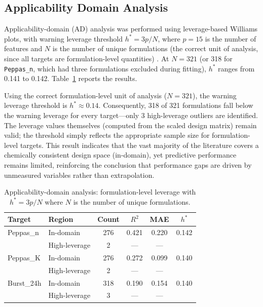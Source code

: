 \documentclass[preprint,12pt,authoryear]{elsarticle}
\begin{document}
\FloatBarrier

\subsection{Applicability Domain Analysis}

Applicability-domain (AD) analysis was performed using leverage-based Williams plots, with warning leverage threshold $h^* = 3p/N$, where $p = 15$ is the number of features and $N$ is the number of unique formulations (the correct unit of analysis, since all targets are formulation-level quantities) \citep{Eriksson2003}. At $N = 321$ (or 318 for \texttt{Peppas\_n}, which had three formulations excluded during fitting), $h^*$ ranges from 0.141 to 0.142. Table~\ref{tab:ad_results} reports the results.

Using the correct formulation-level unit of analysis ($N = 321$), the warning leverage threshold is $h^* \approx 0.14$. Consequently, 318 of 321 formulations fall below the warning leverage for every target---only 3 high-leverage outliers are identified. The leverage values themselves (computed from the scaled design matrix) remain valid; the threshold simply reflects the appropriate sample size for formulation-level targets. This result indicates that the vast majority of the literature covers a chemically consistent design space (in-domain), yet predictive performance remains limited, reinforcing the conclusion that performance gaps are driven by unmeasured variables rather than extrapolation.


\begin{table}[H]
\centering
\caption{Applicability-domain analysis: formulation-level leverage with $h^* = 3p/N$ where $N$ is the number of unique formulations.}
\label{tab:ad_results}
\begin{tabular}{llcccc}
\toprule
Target & Region & Count & $R^2$ & MAE & $h^*$ \\
\midrule
Peppas\_n & In-domain & 276 & 0.421 & 0.220 & 0.142 \\
 & High-leverage & 2 & --- & --- & \\
\midrule
Peppas\_K & In-domain & 276 & 0.272 & 0.099 & 0.140 \\
 & High-leverage & 2 & --- & --- & \\
\midrule
Burst\_24h & In-domain & 318 & 0.190 & 0.154 & 0.140 \\
 & High-leverage & 3 & --- & --- & \\
\bottomrule
\end{tabular}
\end{table}
\end{document}
